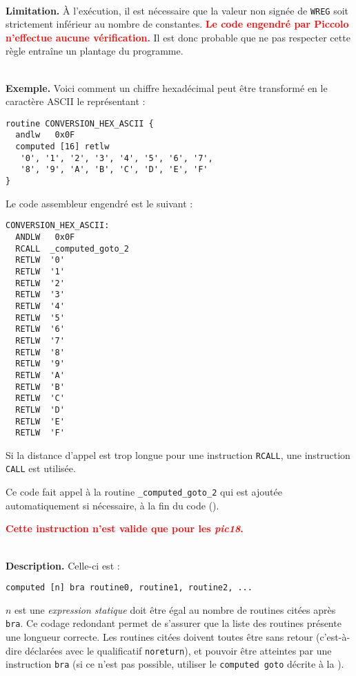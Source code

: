 ~\\
\textbf{Limitation.} À l'exécution, il est nécessaire que la valeur non signée de \texttt{WREG} soit strictement inférieur au nombre de constantes. \textcolor{red}{\bf Le code engendré par Piccolo n'effectue aucune vérification.} Il est donc probable que ne pas respecter cette règle entraîne un plantage du programme.


~\\
\textbf{Exemple.} Voici comment un chiffre hexadécimal peut être transformé en le caractère ASCII le représentant :
\begin{lstlisting}[language=piccolo]
routine CONVERSION_HEX_ASCII {
  andlw   0x0F
  computed [16] retlw
   '0', '1', '2', '3', '4', '5', '6', '7',
   '8', '9', 'A', 'B', 'C', 'D', 'E', 'F'
}
\end{lstlisting}

Le code assembleur engendré est le suivant :
\begin{lstlisting}[language=assembleur]
CONVERSION_HEX_ASCII:
  ANDLW   0x0F
  RCALL  _computed_goto_2
  RETLW  '0'
  RETLW  '1'
  RETLW  '2'
  RETLW  '3'
  RETLW  '4'
  RETLW  '5'
  RETLW  '6'
  RETLW  '7'
  RETLW  '8'
  RETLW  '9'
  RETLW  'A'
  RETLW  'B'
  RETLW  'C'
  RETLW  'D'
  RETLW  'E'
  RETLW  'F'
\end{lstlisting}

Si la distance d'appel est trop longue pour une instruction \texttt{RCALL}, une instruction \texttt{CALL} est utilisée.

Ce code fait appel à la routine \texttt{\_computed\_goto\_2} qui est ajoutée automatiquement si nécessaire, à la fin du code (). 


\textcolor{red}{\bf Cette instruction n'est valide que pour les \emph{pic18}.}

~\\
\textbf{Description.} Celle-ci est :
\begin{lstlisting}[language=piccolo]
computed [n] bra routine0, routine1, routine2, ...
\end{lstlisting}

$n$ est une \emph{expression statique} doit être égal au nombre de routines citées après \texttt{bra}. Ce codage redondant permet de s'assurer que la liste des routines présente une longueur correcte. Les routines citées doivent toutes être sans retour (c'est-à-dire déclarées avec le qualificatif \texttt{noreturn}), et pouvoir être atteintes par une instruction \texttt{bra} (si ce n'est pas possible, utiliser le \texttt{computed goto} décrite à la ).

